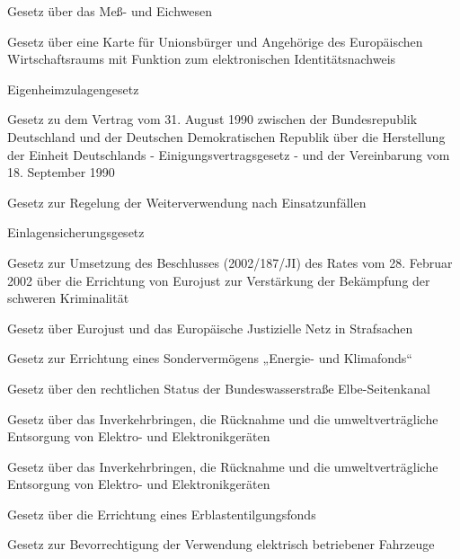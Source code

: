 \item[{EichG}] Gesetz über das Meß- und Eichwesen

\item[{eIDKG}] Gesetz über eine Karte für Unionsbürger und Angehörige des Europäischen Wirtschaftsraums mit Funktion zum elektronischen Identitätsnachweis

\item[{EigZulG}] Eigenheimzulagengesetz

\item[{EinigVtrG}] Gesetz zu dem Vertrag vom 31. August 1990 zwischen der Bundesrepublik Deutschland und der Deutschen Demokratischen Republik über die Herstellung der Einheit Deutschlands - Einigungsvertragsgesetz - und der Vereinbarung vom 18. September 1990

\item[{EinsatzWVG}] Gesetz zur Regelung der Weiterverwendung nach Einsatzunfällen

\item[{EinSiG}] Einlagensicherungsgesetz

\item[{EJG}] Gesetz zur Umsetzung des Beschlusses (2002/187/JI) des Rates vom 28. Februar 2002 über die Errichtung von Eurojust zur Verstärkung der Bekämpfung der schweren Kriminalität

\item[{EJG-2019}] Gesetz über Eurojust und das Europäische Justizielle Netz in Strafsachen

\item[{EKFG}] Gesetz zur Errichtung eines Sondervermögens „Energie- und Klimafonds“

\item[{ElbeSKanalG}] Gesetz über den rechtlichen Status der Bundeswasserstraße Elbe-Seitenkanal

\item[{ElektroG}] Gesetz über das Inverkehrbringen, die Rücknahme und die umweltverträgliche Entsorgung von Elektro- und Elektronikgeräten

\item[{ElektroG-2015}] Gesetz über das Inverkehrbringen, die Rücknahme und die umweltverträgliche Entsorgung von Elektro- und Elektronikgeräten

\item[{ELFG}] Gesetz über die Errichtung eines Erblastentilgungsfonds

\item[{EmoG}] Gesetz zur Bevorrechtigung der Verwendung elektrisch betriebener Fahrzeuge

